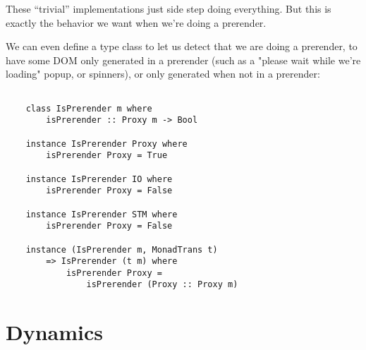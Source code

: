 \documentclass{article}
\begin{document}
These ``trivial'' implementations just side step doing everything.  But
this is exactly the behavior we want when we're doing a prerender.

We can even define a type class to let us detect that we are doing a
prerender, to have some DOM only generated in a prerender (such as a
"please wait while we're loading" popup, or spinners), or only generated
when not in a prerender:

\begin{verbatim}

    class IsPrerender m where
        isPrerender :: Proxy m -> Bool

    instance IsPrerender Proxy where
        isPrerender Proxy = True

    instance IsPrerender IO where
        isPrerender Proxy = False

    instance IsPrerender STM where
        isPrerender Proxy = False

    instance (IsPrerender m, MonadTrans t)
        => IsPrerender (t m) where
            isPrerender Proxy =
                isPrerender (Proxy :: Proxy m)

\end{verbatim}

\section{Dynamics}
\end{document}

